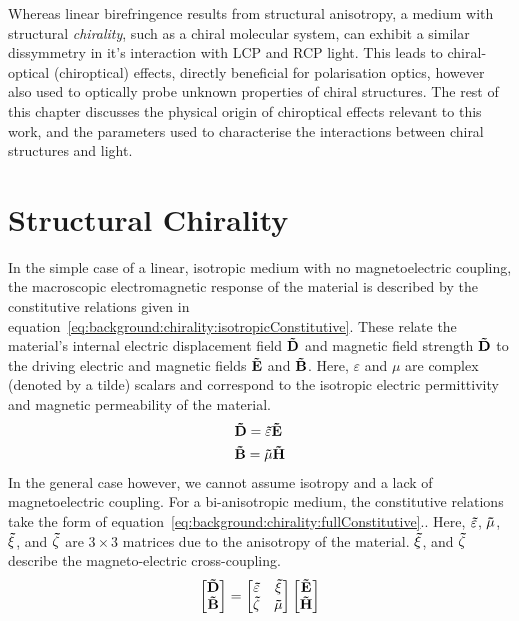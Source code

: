 Whereas linear birefringence results from structural anisotropy, a medium with structural \textit{chirality}, such as a chiral molecular system, can exhibit a similar dissymmetry in it's interaction with LCP and RCP light. This leads to chiral-optical (chiroptical) effects, directly beneficial for polarisation optics, however also used to optically probe unknown properties of chiral structures. The rest of this chapter discusses the physical origin of chiroptical effects relevant to this work, and the parameters used to characterise the interactions between chiral structures and light.


\section{Structural Chirality}\label{sec:background:Chirality:Structural}
In the simple case of a linear, isotropic medium with no magnetoelectric coupling, the macroscopic electromagnetic response of the material is described by the constitutive relations given in equation~\ref{eq:background:chirality:isotropicConstitutive}. These relate the material's internal electric displacement field $\bf{\tilde D}$ and magnetic field strength $\bf{\tilde D}$ to the driving electric and magnetic fields $\bf{\tilde E}$ and $\bf{\tilde B}$. Here, $\varepsilon$ and $\mu$ are complex (denoted by a tilde) scalars and correspond to the isotropic electric permittivity and magnetic permeability of the material.
\begin{equation}\label{eq:background:chirality:isotropicConstitutive}
	\begin{split}
        & \bf{\tilde D} = \tilde \varepsilon \bf{\tilde E} \\
        & \bf{\tilde B} = \tilde \mu \bf{\tilde H}
	\end{split}
\end{equation}
In the general case however, we cannot assume isotropy and a lack of magnetoelectric coupling. For a bi-anisotropic medium, the constitutive relations take the form of equation~\ref{eq:background:chirality:fullConstitutive}.\cite{Ishimaru2003, Capolino2009}. Here, $\bf{\tilde \varepsilon}$, $\bf{\tilde \mu}$, $\bf{\tilde \xi}$, and $\bf{\tilde \zeta}$ are $3 \times 3$ matrices due to the anisotropy of the material. $\bf{\tilde \xi}$, and $\bf{\tilde \zeta}$ describe the magneto-electric cross-coupling.
\begin{equation}\label{eq:background:chirality:fullConstitutive}
    \begin{bmatrix}
        \bf{\tilde D} \\
        \bf{\tilde B}
    \end{bmatrix}
    =
    \begin{bmatrix}
        \bf{\tilde \varepsilon} & \bf{\tilde \xi} \\
        \bf{\tilde \zeta} & \bf{\tilde \mu}
    \end{bmatrix}
    \begin{bmatrix}
        \bf{\tilde E} \\
        \bf{\tilde H}
    \end{bmatrix}
\end{equation}
